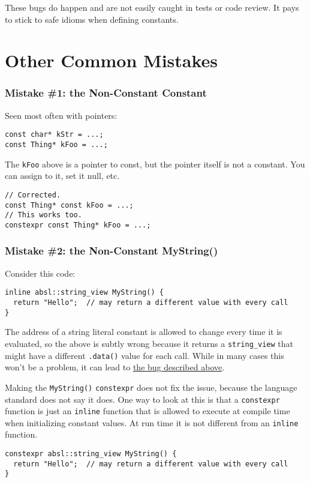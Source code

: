 These bugs do happen and are not easily caught in tests or code review. It pays to stick to safe idioms when defining constants.

\section{Other Common Mistakes}\label{sec:other-common-mistakes}

\subsubsection{Mistake \#1: the Non-Constant Constant}
Seen most often with pointers:
\begin{verbatim}
const char* kStr = ...;
const Thing* kFoo = ...;
\end{verbatim}

The \texttt{kFoo} above is a pointer to const, but the pointer itself is not a constant. You can assign to it, set it null, etc.
\begin{verbatim}
// Corrected.
const Thing* const kFoo = ...;
// This works too.
constexpr const Thing* kFoo = ...;
\end{verbatim}

\subsubsection{Mistake \#2: the Non-Constant MyString()}\label{subsubsec:string-view-mistake}
Consider this code:
\begin{verbatim}
inline absl::string_view MyString() {
  return "Hello";  // may return a different value with every call
}
\end{verbatim}
The address of a string literal constant is allowed to change every time it is evaluated, so the above is subtly wrong because it returns a \texttt{string_view} that might have a different \texttt{.data()} value for each call. While in many cases this won’t be a problem, it can lead to \hyperref[subsubsec:an-example-bug]{the bug described above}.

Making the \texttt{MyString()} \texttt{constexpr} does not fix the issue, because the language standard does not say it does. One way to look at this is that a \texttt{constexpr} function is just an \texttt{inline} function that is allowed to execute at compile time when initializing constant values. At run time it is not different from an \texttt{inline} function.
\begin{verbatim}
constexpr absl::string_view MyString() {
  return "Hello";  // may return a different value with every call
}
\end{verbatim}


